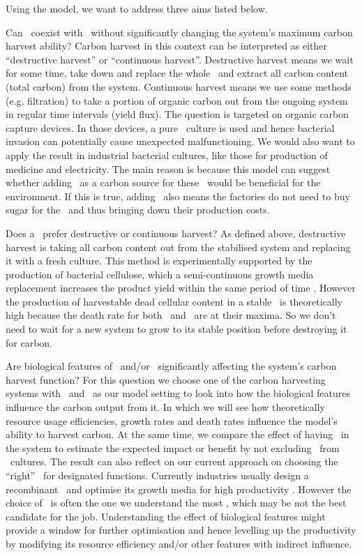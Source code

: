 \documentclass[../thesis.tex]{subfiles} %
\begin{document}
Using the model, we want to address three aims listed below.

Can \bac\ coexist with \phy\ without significantly changing the system’s maximum carbon harvest ability?  Carbon harvest in this context can be interpreted as either ``destructive harvest” or ``continuous harvest”.  Destructive harvest means we wait for some time, take down and replace the whole \pbs\ and extract all carbon content (total carbon) from the system.  Continuous harvest means we use some methods (e.g. filtration) to take a portion of organic carbon out from the ongoing system in regular time intervals (yield flux).  The question is targeted on organic carbon capture devices.  In those devices, a pure \phy\ culture is used \autocite{evanson_2019} and hence bacterial invasion can potentially cause unexpected malfunctioning.  We would also want to apply the result in industrial bacterial cultures, like those for production of medicine and electricity.  The main reason is because this model can suggest whether adding \phy\ as a carbon source for these \bac\ would be beneficial for the environment.  If this is true, adding \phy\ also means the factories do not need to buy sugar for the \bac\ and thus bringing down their production costs.

Does a \pbs\ prefer destructive or continuous harvest?  As defined above, destructive harvest is taking all carbon content out from the stabilised system and replacing it with a fresh culture.  This method is experimentally supported by the production of bacterial cellulose, which a semi-continuous growth media replacement increases the product yield within the same period of time \autocite{aytekin2016statistical}.  However the production of harvestable dead cellular content in a stable \pbs\ is theoretically high because the death rate for both \phy\ and \bac\ are at their maxima.  So we don’t need to wait for a new system to grow to its stable position before destroying it for carbon.

Are biological features of \phy\ and/or \bac\ significantly affecting the system’s carbon harvest function?  For this question we choose one of the carbon harvesting systems with \phy\ and \bac\ as our model setting to look into how the biological features influence the carbon output from it.  In which we will see how theoretically resource usage efficiencies, growth rates and death rates influence the model’s ability to harvest carbon.  At the same time, we compare the effect of having \bac\ in the system to estimate the expected impact or benefit by not excluding \bac\ from \phy\ cultures.  The result can also reflect on our current approach on choosing the ``right” \bac\ for designated functions.  Currently industries usually design a recombinant \bac\ and optimise its growth media for high productivity \autocite{dash2013marine,naik2013lead,huang2012industrial,evanson_2019}.  However the choice of \bac\ is often the one we understand the most \autocite{huang2012industrial}, which may be not the best candidate for the job.  Understanding the effect of biological features might provide a window for further optimisation and hence levelling up the productivity by modifying its resource efficiency and/or other features with indirect influence.
\end{document}
